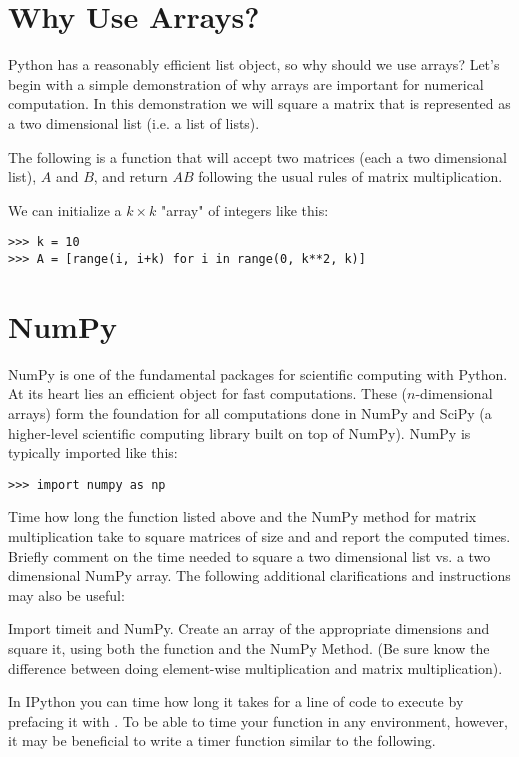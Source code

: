 \label{lab:NumPyArrays}

\section*{Why Use Arrays?} Python has a reasonably efficient list object, 
so why should we use arrays? Let's begin with a simple demonstration of why
arrays are important for numerical computation. In this demonstration 
we will square a matrix that is represented as a two dimensional list 
(i.e. a list of lists).

The following is a function that will accept two matrices (each a two
dimensional list), $A$ and $B$, and return $AB$ following the usual rules
of matrix multiplication. 



We can initialize a $k \times k$ "array" of integers like this:
\begin{lstlisting}
>>> k = 10 
>>> A = [range(i, i+k) for i in range(0, k**2, k)]
\end{lstlisting}

\section*{NumPy} NumPy is one of the fundamental packages for scientific
computing with Python. At its heart lies an efficient 
object for fast computations. These ($n$-dimensional arrays) form
the foundation for all computations done in NumPy and SciPy (a
higher-level scientific computing library built on top of NumPy). NumPy
is typically imported like this: 


\begin{lstlisting}
>>> import numpy as np
\end{lstlisting}


\begin{problem} 
Time how long the  function 
listed above and the NumPy method for matrix multiplication take to square matrices of size 
and  and report the computed times. Briefly comment on the time needed to 
square a two dimensional list vs. a two dimensional NumPy array. The following
additional clarifications and instructions may also be useful:

Import timeit and NumPy. Create an array of the appropriate dimensions and square it, 
using both the function and the NumPy Method. (Be sure know the difference
 between doing element-wise multiplication and matrix multiplication).

In IPython you can time how long it takes for a line of code to execute
by prefacing it with . To be able to time your function in any environment, however, 
it may be beneficial to write a timer function similar to the following.


\end{problem}

